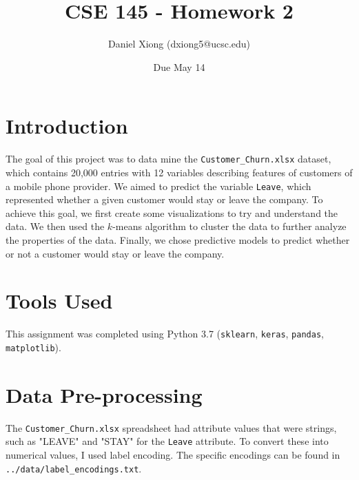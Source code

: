 \documentclass[12pt, notitlepage]{article}
\title{CSE 145 - Homework 2}
\author{Daniel Xiong (dxiong5@ucsc.edu)}
\date{Due May 14}
\begin{document}
\maketitle
\section{Introduction}
The goal of this project was to data mine the \texttt{Customer\_Churn.xlsx} dataset, which contains 20,000 entries with 12 variables describing features of customers of a mobile phone provider. We aimed to predict the variable \texttt{Leave}, which represented whether a given customer would stay or leave the company. To achieve this goal, we first create some visualizations to try and understand the data. We then used the $k$-means algorithm to cluster the data to further analyze the properties of the data. Finally, we chose predictive models to predict whether or not a customer would stay or leave the company.

\section{Tools Used}
This assignment was completed using Python 3.7 (\texttt{sklearn}, \texttt{keras}, \texttt{pandas}, \texttt{matplotlib}).

\section{Data Pre-processing}
The \texttt{Customer\_Churn.xlsx} spreadsheet had attribute values that were strings, such as "LEAVE" and "STAY" for the \texttt{Leave} attribute. To convert these into numerical values, I used label encoding. The specific encodings can be found in \texttt{../data/label\_encodings.txt}.
\end{document}
